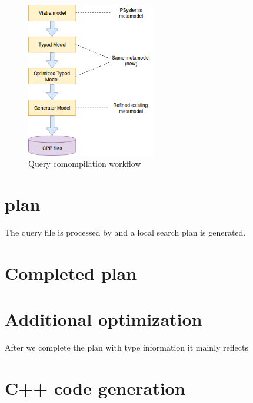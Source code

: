 \begin{figure}[h]
	\begin{center}
		\includegraphics[width=0.5\textwidth]{figures/workflow.png}
		\caption{Query comompilation workflow}
		\label{figure:query-compile-workflow}
	\end{center}
\end{figure}


\section{\viatra{} plan}

The query file is processed by \viatra{} and a local search plan is generated. 


\section{Completed plan}


\section{Additional optimization}

After we complete the plan with type information it mainly reflects 

\section{C++ code generation}


